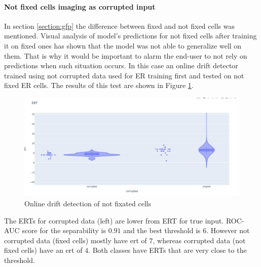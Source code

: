             \paragraph{Not fixed cells imaging as corrupted input}
                In section \ref{section:gfp} the difference between fixed and not fixed cells was mentioned. Visual analysis of model's predictions for not fixed cells after training it on fixed ones has shown that the model was not able to generalize well on them. That is why it would be important to alarm the end-user to not rely on predictions when such situation occurs. In this case an online drift detector trained using not corrupted data used for ER training first and tested on not fixed ER cells. The results of this test are shown in Figure \ref{fig:online-drift-not-fixed}.
                \begin{figure}[H]
                    \begin{center}
                        \includegraphics[width=0.5\linewidth]{bilder/drift-detection/online-fixed-vs-not-fixed.jpg}
                        \caption{Online drift detection of not fixated cells}\label{fig:online-drift-not-fixed}
                    \end{center}
                \end{figure}
                The ERTs for corrupted data (left) are lower from ERT for true input. ROC-AUC score for the separability is $0.91$ and the best threshold is $6$. However not corrupted data (fixed cells) mostly have ert of $7$, whereas corrupted data (not fixed cells) have an ert of $4$. Both classes have ERTs that are very close to the threshold.